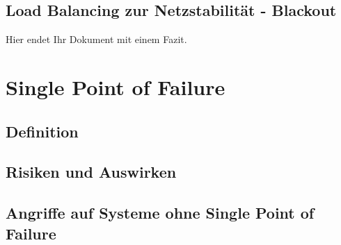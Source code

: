 \documentclass[a4paper,12pt]{article}
\let\stdsection\section
\renewcommand\section{\newpage\stdsection}
\begin{document}
\subsection{Load Balancing zur Netzstabilität - Blackout}
Hier endet Ihr Dokument mit einem Fazit.

\section{Single Point of Failure}
\subsection{Definition}
\subsection{Risiken und Auswirken}
\subsection{Angriffe auf Systeme ohne Single Point of Failure}



\end{document}
